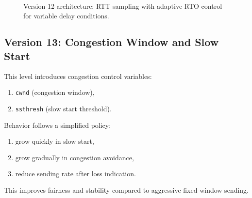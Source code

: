 \begin{figure}[h!]
{%
}
\caption{Version 12 architecture: RTT sampling with adaptive RTO control for variable delay conditions.
}
\label{fig:v12-architecture}
\end{figure}

\clearpage
\subsection{Version 13: Congestion Window and Slow Start}
This level introduces congestion control variables:
\begin{enumerate}
    \item \texttt{cwnd} (congestion window),
    \item \texttt{ssthresh} (slow start threshold).
\end{enumerate}

Behavior follows a simplified policy:
\begin{enumerate}
    \item grow quickly in slow start,
    \item grow gradually in congestion avoidance,
    \item reduce sending rate after loss indication.
\end{enumerate}

This improves fairness and stability compared to aggressive fixed-window
sending.

